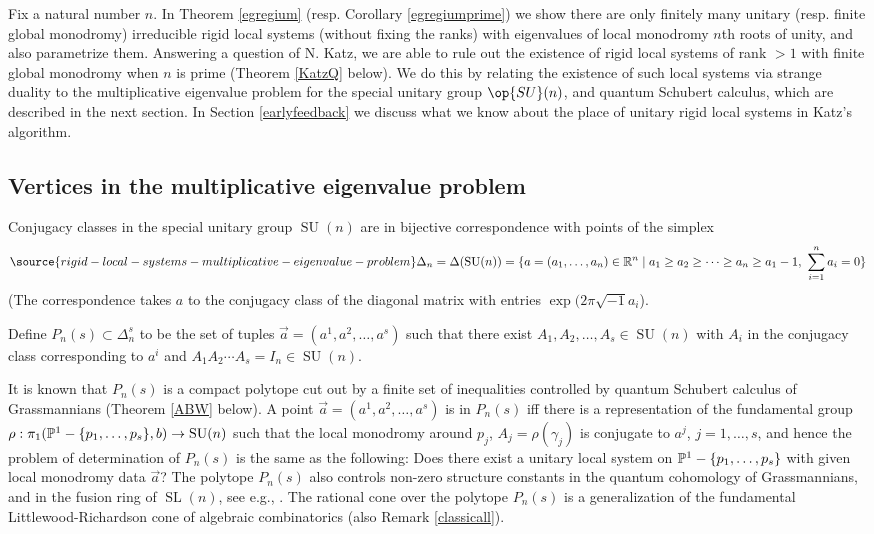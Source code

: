 Fix a natural number $n$. In Theorem \ref{egregium} (resp. Corollary \ref{egregiumprime}) we show there are only finitely many unitary (resp. finite global monodromy) irreducible rigid local systems (without fixing the ranks) with eigenvalues of local monodromy $n$th roots of unity, and also parametrize them. Answering a question of N. Katz, we are able to rule out the existence of rigid local systems of rank $>1$ with  finite global monodromy when $n$ is prime (Theorem \ref{KatzQ} below). We do this by relating the existence of such local systems via strange duality to the multiplicative eigenvalue problem for the special unitary group $\op{SU}(n)$, and quantum Schubert calculus, which are described in the next section. In Section
\ref{earlyfeedback}  we discuss what we know about the place of unitary rigid local systems in Katz's algorithm.


\subsection{Vertices in the multiplicative eigenvalue problem}\label{partita}
 Conjugacy classes in the special unitary group $\operatorname{SU}(n)$ are in bijective correspondence with points of the simplex
\begin{equation}\label{defD}
\source{rigid-local-systems-multiplicative-eigenvalue-problem}
\Delta_n=\Delta(\operatorname{SU}(n))=\{{a}=(a_1,\dots,a_n)\in \Bbb{R}^n\mid  a_1\geq a_2\geq\dots \geq a_n\geq a_1-1,\  \sum_{i=1}^n a_i=0\}
\end{equation}
(The correspondence takes $a$ to the conjugacy class of the diagonal matrix with entries $\exp(2\pi \sqrt{-1}a_i$).

Define $P_n(s)\subset \Delta_n^s$ to be the set of tuples  $\vec{a}=(a^1,a^2,\dots,a^s)$ such that there exist $A_{1}, A_{2}, \dots, A_{s}\in \operatorname{SU}(n)$ with $A_{i}$ in the conjugacy class corresponding to $a^i$ and
$A_{1}A_{2}\cdots A_{s}=I_n\in  \operatorname{SU}(n).$

It is known that $P_n(s)$ is a compact polytope cut out by a finite set of inequalities controlled by quantum Schubert calculus of Grassmannians (Theorem \ref{ABW} below).  A point $\vec{a}=(a^1,a^2,\dots,a^s)$ is in $P_n(s)$ iff there is a representation of the fundamental group $\rho:\pi_1(\Bbb{P}^1-\{p_1,\dots,p_s\},b)\to\operatorname{SU}(n)$ such that the local monodromy around $p_j$, $A_{j}=\rho(\gamma_{j})$ is conjugate to $a^j$, $j=1,\dots,s$, and hence the problem  of determination of $P_n(s)$ is the same as the following: Does there exist a unitary local system on $\Bbb{P}^1-\{p_1,\dots,p_s\}$ with given local monodromy data $\vec{a}$? The polytope $P_n(s)$ also controls non-zero structure constants in the quantum cohomology of Grassmannians, and in the fusion ring of $\operatorname{SL}(n)$, see e.g., \cite{BHorn}. The rational cone over the polytope $P_n(s)$ is a generalization of the fundamental Littlewood-Richardson cone of algebraic combinatorics \cite{FBull,Z} (also Remark \ref{classicall}).


